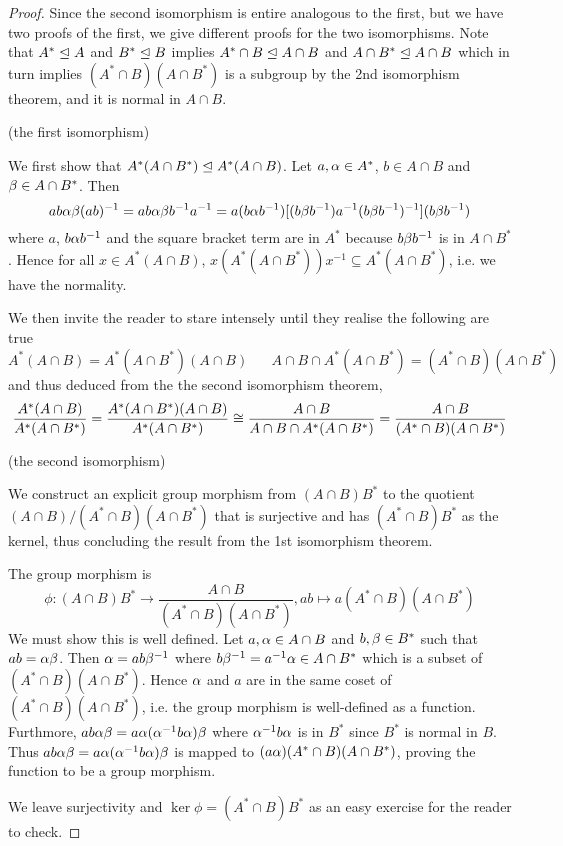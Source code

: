 \documentclass[../../book.tex]{subfiles}
\begin{document}
\begin{proof}
    
    Since the second isomorphism is entire analogous to the first,
    but we have two proofs of the first,
    we give different proofs for the two isomorphisms.
    Note that $A^* \trianglelefteq A$ and $B^* \trianglelefteq B$
    implies $A^* \cap B \trianglelefteq A \cap B$ and $A \cap B^* \trianglelefteq A \cap B$
    which in turn implies $(A^* \cap B)(A \cap B^*)$ is a subgroup
    by the 2nd isomorphism theorem,
    and it is normal in $A \cap B$. 
    
    (the first isomorphism)
    
    We first show that $A^* (A \cap B^*) \trianglelefteq A^* (A \cap B)$. 
    Let $a, \alpha \in A^*$, $b \in A \cap B$ and $\beta \in A \cap B^*$. 
    Then \[
        ab \alpha\beta (ab)^{-1} = ab \alpha\beta b^{-1}a^{-1}
        = a (b\alpha b^{-1}) 
        [ (b\beta b^{-1}) a^{-1} (b\beta b^{-1})^{-1} ]
        (b\beta b^{-1})
    \]
    where $a$, $b\alpha b^{-1}$ and the square bracket term are in $A^*$
    because $b\beta b^{-1}$ is in $A \cap B^*$.
    Hence for all $x \in A^* (A \cap B)$, 
    $x (A^* (A \cap B^*)) x^{-1} \subseteq A^* (A \cap B^*)$,
    i.e. we have the normality. 
    
    We then invite the reader to stare intensely
    until they realise the following are true \[
        A^* (A \cap B) = A^* (A \cap B^*) (A \cap B) \,\,\,\,\,\,\,\,\,\,
        A \cap B \cap A^* (A \cap B^*) = (A^* \cap B)(A \cap B^*)
    \]
    and thus deduced from the the second isomorphism theorem, \[
        \frac {A^* (A \cap B)}{A^* (A \cap B^*)}
        = \frac {A^* (A \cap B^*)(A \cap B)}{A^* (A \cap B^*)}
        \cong \frac{A \cap B}{A \cap B \cap A^*(A \cap B^*) }
        = \frac{A \cap B}{(A^* \cap B)(A \cap B^*)}
    \]
    
    (the second isomorphism)
    
    We construct an explicit group morphism 
    from $(A \cap B)B^*$ to the quotient $(A \cap B) / (A^* \cap B)(A \cap B^*)$
    that is surjective and has $(A^* \cap B)B^*$ as the kernel,
    thus concluding the result from the 1st isomorphism theorem. 
    
    The group morphism is \[
        \phi : (A \cap B)B^* \to \frac{A \cap B}{(A^* \cap B)(A \cap B^*)},
        a b \mapsto a (A^* \cap B)(A \cap B^*)
    \]
    We must show this is well defined.
    Let $a, \alpha \in A \cap B$ and $b, \beta \in B^*$ such that $ab = \alpha \beta$. 
    Then $\alpha = a b \beta^{-1}$ where $b \beta^{-1} = a^{-1} \alpha \in A \cap B^*$
    which is a subset of $(A^* \cap B)(A \cap B^*)$.
    Hence $\alpha$ and $a$ are in the same coset of $(A^* \cap B)(A \cap B^*)$,
    i.e. the group morphism is well-defined as a function. 
    Furthmore, $a b \alpha \beta = a \alpha (\alpha^{-1} b \alpha) \beta$ 
    where $\alpha^{-1} b \alpha$ is in $B^*$ since $B^*$ is normal in $B$.
    Thus $a b \alpha \beta = a \alpha (\alpha^{-1} b \alpha) \beta$ is mapped to 
    $(a \alpha)(A^* \cap B)(A \cap B^*)$,
    proving the function to be a group morphism. 
    
    We leave surjectivity and $\ker \phi = (A^* \cap B) B^*$ 
    as an easy exercise for the reader to check. 
    
\end{proof}
\end{document}
